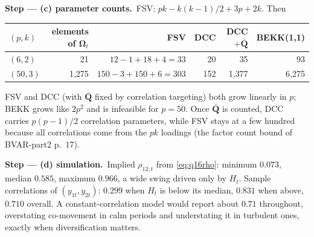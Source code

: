 \documentclass[11pt,a4paper]{article}
\newcommand{\passo}[2]{\par\smallskip\noindent\textbf{Step --- #1.}~#2}
\begin{document}
\begin{sol}
\passo{(c) parameter counts}{FSV: $pk-k(k-1)/2+3p+2k$. Then
\begin{center}\small
\begin{tabular}{lrrrrr}
\toprule
$(p,k)$ & elements of $\bm\Omega_t$ & FSV & DCC & DCC $+\bar{\bm Q}$ & BEKK(1,1)\\
\midrule
$(6,2)$ & 21 & $12-1+18+4=33$ & 20 & 35 & 93\\
$(50,3)$ & 1{,}275 & $150-3+150+6=303$ & 152 & 1{,}377 & 6{,}275\\
\bottomrule
\end{tabular}
\end{center}
FSV and DCC (with $\bar{\bm Q}$ fixed by correlation targeting) both grow linearly in $p$; BEKK grows like $2p^2$ and is
infeasible for $p=50$. Once $\bar{\bm Q}$ is counted, DCC carries $p(p-1)/2$ correlation parameters, while FSV stays at a
few hundred because all correlations come from the $pk$ loadings (the factor count bound of BVAR-part2 p.~17).}

\passo{(d) simulation}{Implied $\rho_{12,t}$ from \eqref{eq:q16rho}: minimum $0.073$, median $0.585$, maximum $0.966$, a wide
swing driven only by $H_t$. Sample correlations of $(y_{1t},y_{2t})$: $0.299$ when $H_t$ is below its median, $0.831$ when
above, $0.710$ overall. A constant-correlation model would report about $0.71$ throughout, overstating co-movement in
calm periods and understating it in turbulent ones, exactly when diversification matters.}


\end{sol}
\end{document}
